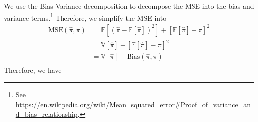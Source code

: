 \documentclass{article}
\newcommand{\stepandtag}{%
  \refstepcounter{equation}%
  \tag{\theequation}%
}
\begin{document}
We use the Bias Variance decomposition to decompose the MSE into the bias and variance terms.\!\footnote{See \url{https://en.wikipedia.org/wiki/Mean_squared_error\#Proof_of_variance_and_bias_relationship}.}
Therefore, we simplify the MSE into 
\begin{align*}
    \text{MSE}(\hat{\pi}, \pi) &= \mathbb{E}\left[ {\left( \hat{\pi} - \mathbb{E}[\hat{\pi}] \right)}^2 \right] + {\left[ \mathbb{E}[\hat{\pi}] - \pi \right]}^2 \\
    &= \mathbb{V}\left[ \hat{\pi} \right] + {\left[ \mathbb{E}[\hat{\pi}] - \pi \right]}^2 \\
    &= \mathbb{V}\left[ \hat{\pi} \right] + \text{Bias}(\hat{\pi}, \pi) \\
\end{align*}
Therefore, we have
\end{document}
